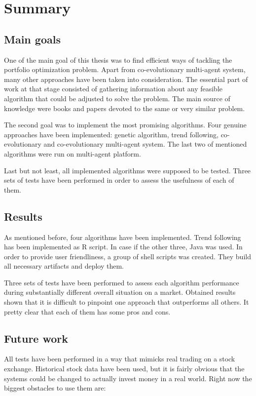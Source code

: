\chapter{Summary}

\section{Main goals}

One of the main goal of this thesis was to find efficient ways of tackling the portfolio optimization problem.
Apart from co-evolutionary multi-agent system, many other approaches have been taken into consideration.
The essential part of work at that stage consisted of gathering information about any feasible algorithm that could be adjusted to solve the problem. 
The main source of knowledge were books and papers devoted to the same or very similar problem. 


The second goal was to implement the most promising algorithms.
Four genuine approaches have been implemented: genetic algorithm, trend following, co-evolutionary and co-evolutionary multi-agent system.
The last two of mentioned algorithms were run on multi-agent platform. 

Last but not least, all implemented algorithms were supposed to be tested. 
Three sets of tests have been performed in order to assess the usefulness of each of them.


\section{Results}

As mentioned before, four algorithms have been implemented.
Trend following has been implemented as R script.
In case if the other three, Java was used.
In order to provide user friendliness, a group of shell scripts was created.
They build all necessary artifacts and deploy them.
   
Three sets of tests have been performed to assess each algorithm performance during substantially different overall situation on a market.
Obtained results shown that it is difficult to pinpoint one approach that outperforms all others.
It pretty clear that each of them has some pros and cons.


\section{Future work}

All tests have been performed in a way that mimicks real trading on a stock exchange.
Historical stock data have been used, but it is fairly obvious that the systems could be changed to actually invest money in a real world.
Right now the biggest obstacles to use them are:


